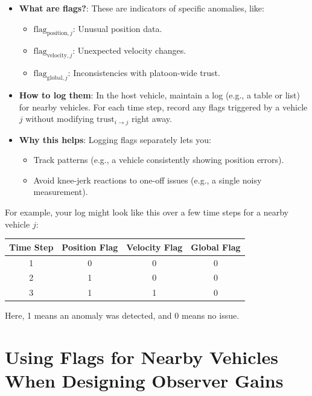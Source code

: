 \documentclass{article}
\begin{document}
\begin{itemize}
    \item \textbf{What are flags?}: These are indicators of specific anomalies, like:
    \begin{itemize}
        \item \( \text{flag}_{\text{position}, j} \): Unusual position data.
        \item \( \text{flag}_{\text{velocity}, j} \): Unexpected velocity changes.
        \item \( \text{flag}_{\text{global}, j} \): Inconsistencies with platoon-wide trust.
    \end{itemize}
    
    \item \textbf{How to log them}: In the host vehicle, maintain a log (e.g., a table or list) for nearby vehicles. For each time step, record any flags triggered by a vehicle \( j \) without modifying \( \text{trust}_{i \to j} \) right away.
    
    \item \textbf{Why this helps}: Logging flags separately lets you:
    \begin{itemize}
        \item Track patterns (e.g., a vehicle consistently showing position errors).
        \item Avoid knee-jerk reactions to one-off issues (e.g., a single noisy measurement).
    \end{itemize}
\end{itemize}

For example, your log might look like this over a few time steps for a nearby vehicle \( j \):

\begin{center}
    \begin{tabular}{cccc}
        \toprule
        Time Step & Position Flag & Velocity Flag & Global Flag \\
        \midrule
        1 & 0 & 0 & 0 \\
        2 & 1 & 0 & 0 \\
        3 & 1 & 1 & 0 \\
        \bottomrule
    \end{tabular}
\end{center}

Here, 1 means an anomaly was detected, and 0 means no issue.

\section{Using Flags for Nearby Vehicles When Designing Observer Gains}
\end{document}
